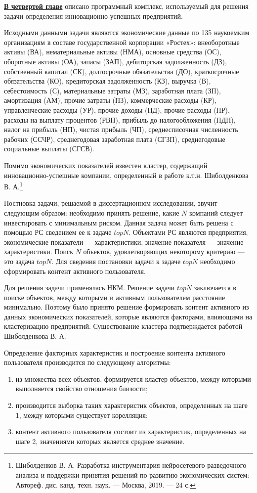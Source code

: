 
{\underline {\bf В четвертой главе}} описано программный комплекс,
используемый для решения задачи определения инновационно-успешных предприятий.

Исходными данными задачи являются экономические данные по 135
наукоемким организациям в составе государственной корпорации «Ростех»:
внеоборотные активы (ВА), нематериальные активы (НМА), основные средства (ОС), оборотные
активы (ОА), запасы (ЗАП), дебиторская задолженность (ДЗ), собственный капитал (СК),
долгосрочные обязательства (ДО), краткосрочные обязательства (КО), кредиторская
задолженность (КЗ), выручка (В), себестоимость (С), материальные затраты (МЗ),
заработная плата (ЗП), амортизация (АМ), прочие затраты (ПЗ), коммерческие расходы (КР),
управленческие расходы (УР), прочие доходы (ПД), прочие расходы (ПР), расходы на
выплату процентов (РВП), прибыль до налогообложения (ПДН), налог на прибыль (НП),
чистая прибыль (ЧП), среднесписочная численность рабочих (ССЧР), среднегодовая
заработная плата (СГЗП), среднегодовые социальные выплаты (СГСВ).

Помимо экономических показателей известен кластер, содержащий инновационно-успешные
компании, определенный в работе к.т.н. Шиболденкова В. А.\footnote{
Шиболденков В. А. Разработка инструментария нейросетевого разведочного анализа и поддержки принятия решений по развитию экономических систем: Автореф. дис. канд. техн. наук. — Москва, 2019. — 24 с.
}

Постновка задачи, решаемой в диссертационном исследовании, звучит следующим образом:
необходимо принять решение, какие $N$ компаний следует инвестировать с минимальным риском.
Данная задача может быть решена с помощью РС сведением ее к задаче $topN$.
Объектами РС являются предприятия, экономические показатели --- характеристики, значение
показателя --- значение характеристики. Поиск $N$ объектов, удовлетворяющих некоторому критерию --- это задача $topN$.
Для сведения постановки задачи к задаче $topN$ необходимо сформировать контент активного пользователя.

Для решения задачи применялась НКМ. Решение задачи $topN$ заключается в поиске объектов, между которыми и активным пользователем
расстояние минимально. Поэтому было принято решение формировать контент активного из данных экономических показателей, которые
являются факторами, влияющими на кластеризацию предприятий. Существование кластера подтверждается работой Шиболденкова В. А. 

Определение факторных характеристик и построение контента активного пользователя производится по следующему алгоритмы:
\begin{enumerate}
\item из множества всех объектов, формируется кластер объектов, между которыми выполняется свойство отношения близости;
\item производится выборка таких характеристик объектов, определенных на шаге 1, между которыми существует корелляция;
\item контент активного пользователя состоит из характеристик, определенных на шаге 2, значениями которых является среднее значение.
\end{enumerate}

